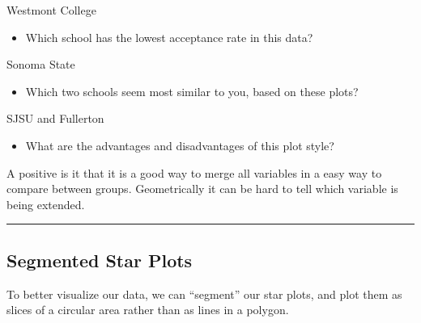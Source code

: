 \documentclass[]{article}
\newenvironment{Shaded}{\begin{snugshade}}{\end{snugshade}}
\newcommand{\DataTypeTok}[1]{\textcolor[rgb]{0.13,0.29,0.53}{#1}}
\newcommand{\DecValTok}[1]{\textcolor[rgb]{0.00,0.00,0.81}{#1}}
\newcommand{\FloatTok}[1]{\textcolor[rgb]{0.00,0.00,0.81}{#1}}
\newcommand{\KeywordTok}[1]{\textcolor[rgb]{0.13,0.29,0.53}{\textbf{#1}}}
\newcommand{\NormalTok}[1]{#1}
\newcommand{\OperatorTok}[1]{\textcolor[rgb]{0.81,0.36,0.00}{\textbf{#1}}}
\newcommand{\OtherTok}[1]{\textcolor[rgb]{0.56,0.35,0.01}{#1}}
\newcommand{\StringTok}[1]{\textcolor[rgb]{0.31,0.60,0.02}{#1}}
\providecommand{\tightlist}{%
  \setlength{\itemsep}{0pt}\setlength{\parskip}{0pt}}
\begin{document}
Westmont College

\begin{itemize}
\tightlist
\item
  Which school has the lowest acceptance rate in this data?
\end{itemize}

Sonoma State

\begin{itemize}
\tightlist
\item
  Which two schools seem most similar to you, based on these plots?
\end{itemize}

SJSU and Fullerton

\begin{itemize}
\tightlist
\item
  What are the advantages and disadvantages of this plot style?
\end{itemize}

A positive is it that it is a good way to merge all variables in a easy
way to compare between groups. Geometrically it can be hard to tell
which variable is being extended.

\begin{center}\rule{0.5\linewidth}{\linethickness}\end{center}

\hypertarget{segmented-star-plots}{%
\subsection{Segmented Star Plots}\label{segmented-star-plots}}

To better visualize our data, we can ``segment'' our star plots, and
plot them as slices of a circular area rather than as lines in a
polygon.

\begin{Shaded}
\end{Shaded}
\end{document}
